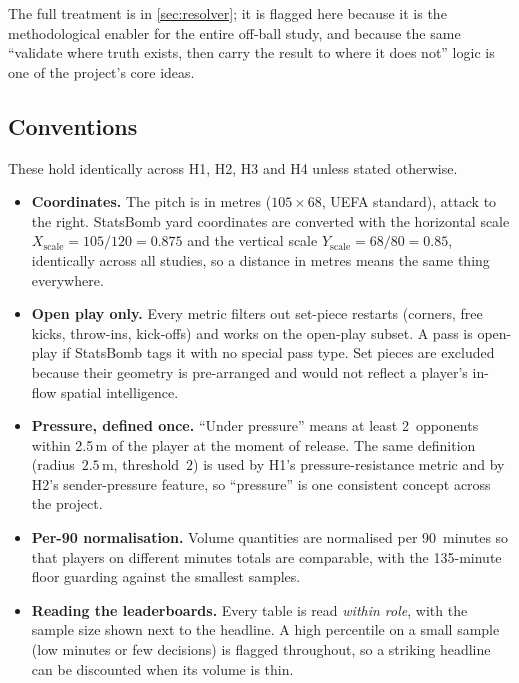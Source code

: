 \documentclass[12pt,a4paper]{article}
\begin{document}
The full treatment is in \cref{sec:resolver}; it is flagged here because it is the methodological enabler for the entire off-ball study, and because the same ``validate where truth exists, then carry the result to where it does not'' logic is one of the project's core ideas.

\subsection{Conventions}\label{sec:conventions}

These hold identically across H1, H2, H3 and H4 unless stated otherwise.

\begin{itemize}
    \item \textbf{Coordinates.} The pitch is in metres ($105 \times 68$, UEFA standard), attack to the right. StatsBomb yard coordinates are converted with the horizontal scale $X_{\text{scale}} = 105/120 = 0.875$ and the vertical scale $Y_{\text{scale}} = 68/80 = 0.85$, identically across all studies, so a distance in metres means the same thing everywhere.
    \item \textbf{Open play only.} Every metric filters out set-piece restarts (corners, free kicks, throw-ins, kick-offs) and works on the open-play subset. A pass is open-play if StatsBomb tags it with no special pass type. Set pieces are excluded because their geometry is pre-arranged and would not reflect a player's in-flow spatial intelligence.
    \item \textbf{Pressure, defined once.} ``Under pressure'' means at least 2~opponents within 2.5\,m of the player at the moment of release. The same definition (radius~$2.5$\,m, threshold~$2$) is used by H1's pressure-resistance metric and by H2's sender-pressure feature, so ``pressure'' is one consistent concept across the project.
    \item \textbf{Per-90 normalisation.} Volume quantities are normalised per 90~minutes so that players on different minutes totals are comparable, with the 135-minute floor guarding against the smallest samples.
    \item \textbf{Reading the leaderboards.} Every table is read \emph{within role}, with the sample size shown next to the headline. A high percentile on a small sample (low minutes or few decisions) is flagged throughout, so a striking headline can be discounted when its volume is thin.
\end{itemize}

\clearpage
\end{document}
